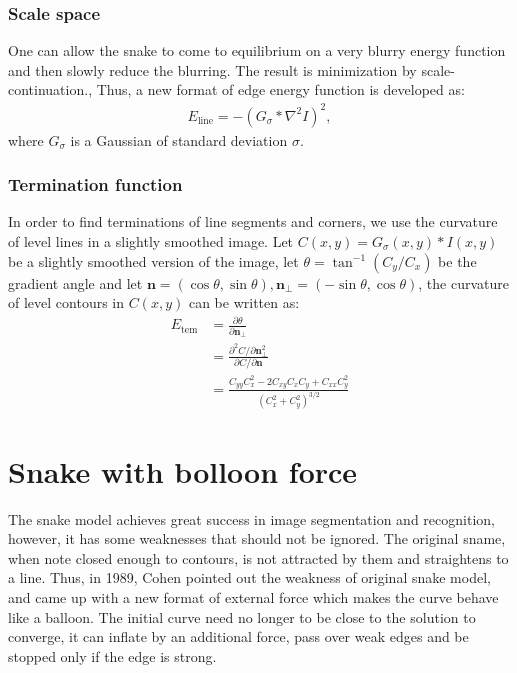 \documentclass[journal]{IEEEtran}
\begin{document}
\subsubsection{Scale space}
One can allow the snake to come to equilibrium on a very blurry energy function and then slowly reduce the blurring. The result is minimization by scale-continuation.\cite{s20},\cite{s21} Thus, a new format of edge energy function is developed as:
\begin{equation}\begin{aligned}
E_{\text{line}}=-(G_\sigma * \nabla^2I)^2,
\end{aligned}\end{equation}
where $G_\sigma$ is a Gaussian of standard deviation $\sigma$.
\subsubsection{Termination function}
In order to find terminations of line segments and corners, we use the curvature of level lines in a slightly smoothed image. Let $C(x,y)=G_\sigma(x,y)*I(x,y)$ be a slightly smoothed version of the image, let $\theta=\tan^{-1}{(C_y/C_x)}$ be the gradient angle and let $\mathbf{n}=(\cos \theta,\sin\theta),\mathbf{n}_\perp=(-\sin\theta,\cos\theta)$, the curvature of level contours in $C(x,y)$ can be written as:
\begin{equation}\begin{aligned}
    E_{\mathrm{tem}} &=\frac{\partial \theta}{\partial \mathbf{n}_{\perp}} \\
    &=\frac{\partial^{2} C / \partial \mathbf{n}_{\perp}^{2}}{\partial C / \partial \mathbf{n}} \\
    &=\frac{C_{y y} C_{x}^{2}-2 C_{x y} C_{x} C_{y}+C_{x x} C_{y}^{2}}{\left(C_{x}^{2}+C_{y}^{2}\right)^{3 / 2}}
\end{aligned}\end{equation}

\section{Snake with bolloon force}
The snake model achieves great success in image segmentation and recognition, however, it has some weaknesses that should not be ignored. The original sname, when note closed enough to contours, is not attracted by them and straightens to a line. Thus, in 1989, Cohen\cite{balloon} pointed out the weakness of original snake model, and came up with a new format of external force which makes the curve behave like a balloon. The initial curve need no longer to be close to the solution to converge, it can inflate by an additional force, pass over weak edges and be stopped only if the edge is strong.
\end{document}
